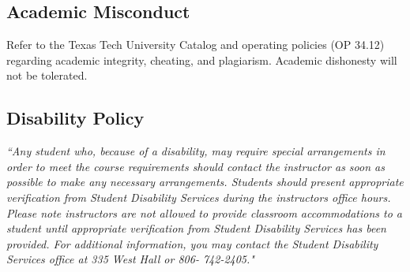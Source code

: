 \documentclass[12pt]{article}
\begin{document}
\subsection*{Academic Misconduct}
Refer to the Texas Tech University Catalog and operating policies (OP 34.12) regarding
academic integrity, cheating, and plagiarism. Academic dishonesty will not be tolerated.
\subsection*{Disability Policy}
\textsl{ ``Any student who, because of a disability, may require special arrangements in order to meet
the course requirements should contact the instructor as soon as possible to make any necessary arrangements.
Students should present appropriate verification from Student Disability Services during the instructors office hours. Please note instructors are not allowed to provide classroom accommodations
to a student until appropriate verification from Student Disability Services has been provided.
For additional information, you may contact the Student Disability Services office at 335 West Hall or
806- 742-2405."}



\end{document}
